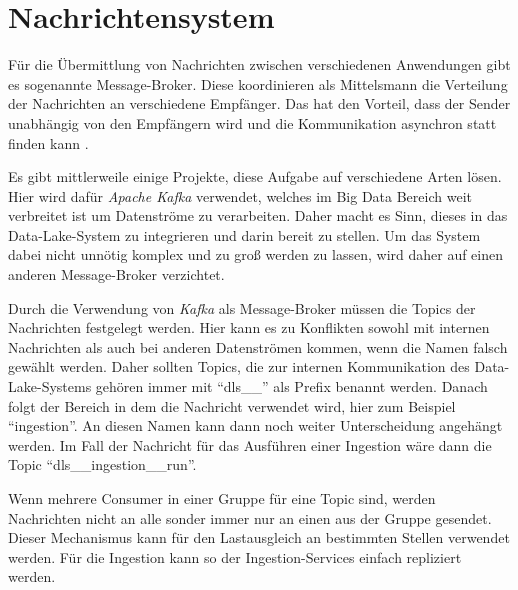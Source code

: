 \section{Nachrichtensystem}

Für die Übermittlung von Nachrichten zwischen verschiedenen Anwendungen gibt es sogenannte Message-Broker.
Diese koordinieren als Mittelsmann die Verteilung der Nachrichten an verschiedene Empfänger.
Das hat den Vorteil, dass der Sender unabhängig von den Empfängern wird und die Kommunikation asynchron statt finden kann \parencite{message-broker}.

Es gibt mittlerweile einige Projekte, diese Aufgabe auf verschiedene Arten lösen.
Hier wird dafür \textit{Apache Kafka} verwendet, welches im Big Data Bereich weit verbreitet ist um Datenströme zu verarbeiten.
Daher macht es Sinn, dieses in das Data-Lake-System zu integrieren und darin bereit zu stellen.
Um das System dabei nicht unnötig komplex und zu groß werden zu lassen, wird daher auf einen anderen Message-Broker verzichtet.

Durch die Verwendung von \textit{Kafka} als Message-Broker müssen die Topics der Nachrichten festgelegt werden.
Hier kann es zu Konflikten sowohl mit internen Nachrichten als auch bei anderen Datenströmen kommen, wenn die Namen falsch gewählt werden.
Daher sollten Topics, die zur internen Kommunikation des Data-Lake-Systems gehören immer mit "`dls\_\_"' als Prefix benannt werden.
Danach folgt der Bereich in dem die Nachricht verwendet wird, hier zum Beispiel "`ingestion"'.
An diesen Namen kann dann noch weiter Unterscheidung angehängt werden.
Im Fall der Nachricht für das Ausführen einer Ingestion wäre dann die Topic "`dls\_\_ingestion\_\_run"'.

Wenn mehrere Consumer in einer Gruppe für eine Topic sind, werden Nachrichten nicht an alle sonder immer nur an einen aus der Gruppe gesendet.
Dieser Mechanismus kann für den Lastausgleich an bestimmten Stellen verwendet werden.
Für die Ingestion kann so der Ingestion-Services einfach repliziert werden.